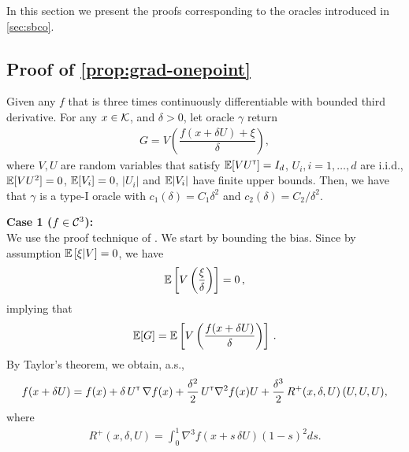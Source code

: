 In this section we present the proofs corresponding to the oracles introduced in \cref{sec:sbco}.

\subsection{Proof of \cref{prop:grad-onepoint}}



\begin{proposition}
\label{prop:grad-1spsa}
Given any $f$ that is three times continuously differentiable with bounded third derivative.
For any $x \in \mathcal{K}$, and $\delta >0$, let oracle $\gamma$ return
\begin{align}
G =  V \left(\dfrac{f(x+\delta U) + \xi}{\delta}\right),
 \label{eq:onesp}
\end{align}
where $V, U$ are random variables that satisfy $\mathbb{E}[V U^\mathsf{\scriptscriptstyle T}] = I_d$, $U_i, i=1,\ldots,d$ are i.i.d., $\mathbb{E}[ V U^2] = 0$, $\mathbb{E}[V_i]=0$, $|U_i|$ and $\mathbb{E}|V_i|$ have finite upper bounds.
Then, we have that $\gamma$ is a type-I oracle with $c_1(\delta) = C_1 \delta^2$ and $c_2(\delta) = C_2/\delta^2$.
\end{proposition}
\fi
\textbf{Case 1 ($f \in \mathcal{C}^3$): }\ \\
We use the proof technique of \cite{spall1997one}.
We start by bounding the bias.
Since by assumption $\mathbb{E}\left[ \xi|V\right]=0$, we have
\begin{align*}
\mathbb{E}\left[  V\left(\dfrac{\xi}{\delta}\right) \right]= 0\,,
\end{align*}
implying that
\begin{align*}
\mathbb{E}[G] =  \mathbb{E}\left[ V \left(\dfrac{f(x+\delta U) }{\delta}\right)\right] \,.
\end{align*}
By Taylor's theorem, we obtain, a.s.,
\begin{align*}
f(x + \delta U) =
 f(x)
 +\delta\,  U^\mathsf{\scriptscriptstyle T}\,\nabla f(x)
  + \frac{\delta^2}{2}\, U^\mathsf{\scriptscriptstyle T} \nabla^2 f(x) U
  +  \frac{\delta^3}{2} \, R^{+}(x,\delta,U) \,(U, U, U),
\end{align*}
where
\begin{align}
 R^{+}(x,\delta,U)= \int_0^1  \nabla^3 f(  x + s \, \delta U ) (1-s)^2 ds. \label{eq:taylor-r}
\end{align}
